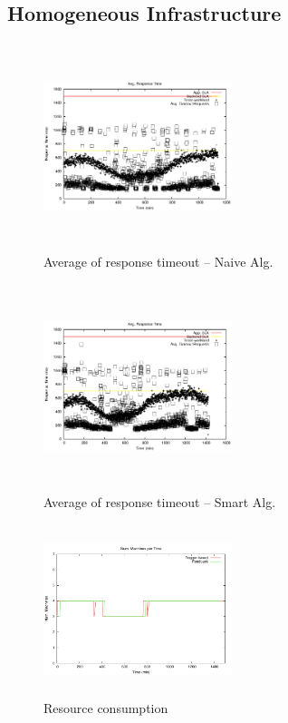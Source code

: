\subsection{Homogeneous Infrastructure}


\begin{figure}
\begin{center}
\includegraphics[width=0.49\textwidth, height=6cm]{./images/homogeneous/avgTimeoutAllReqs_minNaive}
\end{center}
\caption{Average of  response timeout -- Naive Alg.}
\end{figure}


\begin{figure}
\begin{center}
\includegraphics[width=0.49\textwidth, height=6cm]{./images/homogeneous/avgTimeoutAllReqs_minSmart}
\end{center}
\caption{Average of response timeout -- Smart Alg.}
\end{figure}

\begin{figure}
\begin{center}
\includegraphics[width=0.49\textwidth, height=5cm]{./images/homogeneous/numMachinesComp}
\end{center}
\caption{Resource consumption}
\end{figure}

